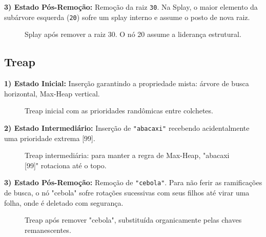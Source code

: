 \documentclass[conference]{IEEEtran}
\begin{document}
\textbf{3) Estado Pós-Remoção:} Remoção da raiz \texttt{30}. Na Splay, o maior elemento da subárvore esquerda (\texttt{20}) sofre um splay interno e assume o posto de nova raiz.
\begin{figure}[htbp]
\centering
{}
\caption{Splay após remover a raiz 30. O nó 20 assume a liderança estrutural.}
\label{fig:splay3}
\end{figure}

\subsection{Treap}

\textbf{1) Estado Inicial:} Inserção garantindo a propriedade mista: árvore de busca horizontal, Max-Heap vertical.
\begin{figure}[htbp]
\centering
{}
\caption{Treap inicial com as prioridades randômicas entre colchetes.}
\label{fig:treap1}
\end{figure}

\textbf{2) Estado Intermediário:} Inserção de \texttt{"abacaxi"} recebendo acidentalmente uma prioridade extrema [99].
\begin{figure}[htbp]
\centering
{}
\caption{Treap intermediária: para manter a regra de Max-Heap, "abacaxi [99]" rotaciona até o topo.}
\label{fig:treap2}
\end{figure}

\textbf{3) Estado Pós-Remoção:} Remoção de \texttt{"cebola"}. Para não ferir as ramificações de busca, o nó "cebola" sofre rotações sucessivas com seus filhos até virar uma folha, onde é deletado com segurança.
\begin{figure}[htbp]
\centering
{}
\caption{Treap após remover "cebola", substituída organicamente pelas chaves remanescentes.}
\label{fig:treap3}
\end{figure}
\end{document}
